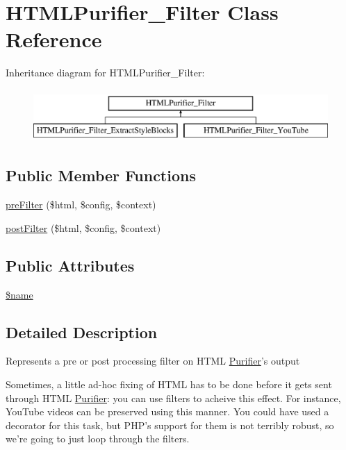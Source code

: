 \hypertarget{classHTMLPurifier__Filter}{\section{H\+T\+M\+L\+Purifier\+\_\+\+Filter Class Reference}
\label{classHTMLPurifier__Filter}
}
Inheritance diagram for H\+T\+M\+L\+Purifier\+\_\+\+Filter\+:\begin{figure}[H]
\begin{center}
\leavevmode
\includegraphics[height=2.000000cm]{classHTMLPurifier__Filter}
\end{center}
\end{figure}
\subsection*{Public Member Functions}
\begin{DoxyCompactItemize}
\item 
\hyperlink{classHTMLPurifier__Filter_a194734e8341711884c60394a0d44e1f3}{pre\+Filter} (\$html, \$config, \$context)
\item 
\hyperlink{classHTMLPurifier__Filter_ad9d7784d7b840ce943f5e20fbf4dd75c}{post\+Filter} (\$html, \$config, \$context)
\end{DoxyCompactItemize}
\subsection*{Public Attributes}
\begin{DoxyCompactItemize}
\item 
\hyperlink{classHTMLPurifier__Filter_a5ba5b60834e169792f9005bc75000c21}{\$name}
\end{DoxyCompactItemize}


\subsection{Detailed Description}
Represents a pre or post processing filter on H\+T\+M\+L \hyperlink{classPurifier}{Purifier}'s output

Sometimes, a little ad-\/hoc fixing of H\+T\+M\+L has to be done before it gets sent through H\+T\+M\+L \hyperlink{classPurifier}{Purifier}\+: you can use filters to acheive this effect. For instance, You\+Tube videos can be preserved using this manner. You could have used a decorator for this task, but P\+H\+P's support for them is not terribly robust, so we're going to just loop through the filters.

